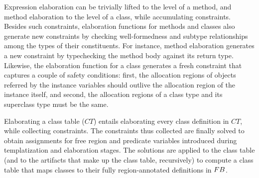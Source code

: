 
Expression elaboration can be trivially lifted to the level of a
method, and method elaboration to the level of a class, while
accumulating constraints. Besides such constraints, elaboration
functions for methods and classes also generate new constraints by
checking well-formedness and subtype relationships among the types of
their constituents. For instance, method elaboration generates a new
constraint by typechecking the method body against its return type.
Likewise, the elaboration function for a class generates a fresh
constraint that captures a couple of safety conditions: first, the
allocation regions of objects referred by the instance variables
should outlive the allocation region of the instance itself, and
second, the allocation regions of a class type and its superclass type
must be the same.

Elaborating a class table ($CT$) entails elaborating every class
definition in $CT$, while collecting constraints. The constraints thus
collected are finally solved to obtain assignments for free region and
predicate variables introduced during templatization and elaboration
stages. The solutions are applied to the class table (and to the
artifacts that make up the class table, recursively) to compute a
class table that maps classes to their fully region-annotated
definitions in ${\sc FB}$.

